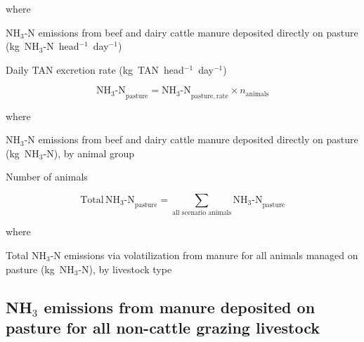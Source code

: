 \noindent where

\begin{description}[font=\normalfont, leftmargin=12em, style=nextline, nosep]
    \item[$\mathrm{NH_3\text{-}N}_{\mathrm{pasture,rate}}$]
        NH$_3$-N emissions from beef and dairy cattle manure deposited directly
        on pasture (kg~NH$_3$-N~head$^{-1}$~day$^{-1}$)
    \item[$\mathrm{TAN}_{\mathrm{excretion,rate}}$]
        Daily TAN excretion rate (kg~TAN~head$^{-1}$~day$^{-1}$)
\end{description}

\begin{equation}
    \mathrm{NH_3\text{-}N}_{\mathrm{pasture}}
        = \mathrm{NH_3\text{-}N}_{\mathrm{pasture,rate}}
          \times n_{\mathrm{animals}}
    \tag{Eq.\ 5.4.1-4}
\end{equation}

\noindent where

\begin{description}[font=\normalfont, leftmargin=12em, style=nextline, nosep]
    \item[$\mathrm{NH_3\text{-}N}_{\mathrm{pasture}}$]
        NH$_3$-N emissions from beef and dairy cattle manure deposited directly
        on pasture (kg~NH$_3$-N), by animal group
    \item[$n_{\mathrm{animals}}$] Number of animals
\end{description}

\begin{equation}
    \mathrm{Total\,NH_3\text{-}N}_{\mathrm{pasture}}
        = \sum_{\text{all scenario animals}} \mathrm{NH_3\text{-}N}_{\mathrm{pasture}}
    \tag{Eq.\ 5.4.1-5}
\end{equation}

\noindent where

\begin{description}[font=\normalfont, leftmargin=12em, style=nextline, nosep]
    \item[$\mathrm{Total\,NH_3\text{-}N}_{\mathrm{pasture}}$]
        Total NH$_3$-N emissions via volatilization from manure for all animals
        managed on pasture (kg~NH$_3$-N), by livestock type
\end{description}

\subsection{NH\texorpdfstring{$_3$}{3} emissions from manure deposited on pasture for all non-cattle grazing livestock}
\label{subsec:grazing-nh3-noncattle}

